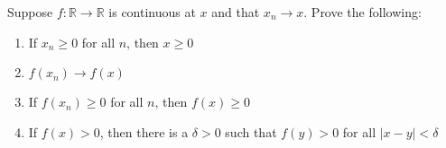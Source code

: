 \documentclass[crop=false,class=article,oneside]{standalone}
\begin{document}
        \begin{problem}
            Suppose $f:\mathbb{R}\rightarrow\mathbb{R}$ is
            continuous at $x$ and that $x_{n}\rightarrow{x}$.
            Prove the following:
            \begin{enumerate}
                \item If $x_{n}\geq{0}$ for all $n$,
                      then $x\geq{0}$
                \item $f(x_{n})\rightarrow{f(x)}$
                \item If $f(x_{n})\geq{0}$ for all $n$,
                      then $f(x)\geq{0}$
                \item If $f(x)>0$, then there is a
                      $\delta>0$ such that $f(y)>0$ for
                      all $|x-y|<\delta$
            \end{enumerate}
        \end{problem}
\end{document}

